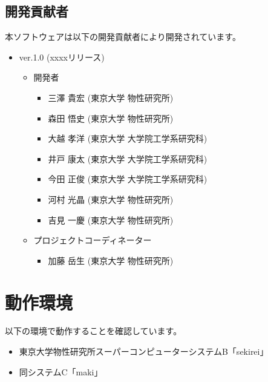 \subsection{開発貢献者}
\label{subsec:developers}
本ソフトウェアは以下の開発貢献者により開発されています。
\begin{itemize}
\item{ver.1.0 (xxxxリリース)}
\begin{itemize}
\item{開発者}
	\begin{itemize}
	\item{三澤 貴宏 (東京大学 物性研究所)}
	\item{森田 悟史 (東京大学 物性研究所)}
	\item{大越 孝洋 (東京大学 大学院工学系研究科)}
	\item{井戸 康太 (東京大学 大学院工学系研究科)}
	\item{今田 正俊 (東京大学 大学院工学系研究科)}
	\item{河村 光晶 (東京大学 物性研究所)}
	\item{吉見 一慶 (東京大学 物性研究所)}
	\end{itemize}

\item{プロジェクトコーディネーター}
	\begin{itemize}
	\item{加藤 岳生 (東京大学 物性研究所)}
	\end{itemize}

\end{itemize}

\end{itemize}


\section{動作環境}
 以下の環境で動作することを確認しています。
\begin{itemize}
\item 東京大学物性研究所スーパーコンピューターシステムB「sekirei」
\item 同システムC「maki」
\end{itemize}
